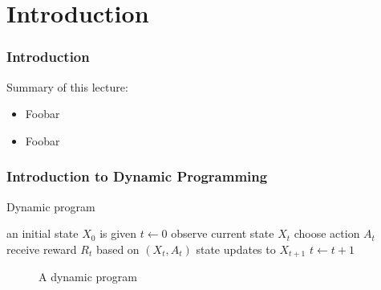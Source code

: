 


\subtitle{Dynamic Programming}

\author{John Stachurski}

\date{September 2022}




\begin{frame}
  \titlepage
\end{frame}


\section{Introduction}


\begin{frame}
    \frametitle{Introduction}

    Summary of this lecture:

    \begin{itemize}
        \item Foobar
            \vspace{0.3em}
        \item Foobar
    \end{itemize}

            \vspace{0.3em}
            \vspace{0.3em}


\end{frame}





\begin{frame}
    \frametitle{Introduction to Dynamic Programming}

    Dynamic program

    \begin{algorithm}[H]
      \DontPrintSemicolon
      an initial state $X_0$ is given \;
      $t \leftarrow 0$ \; %
      {
          observe current state $X_t$   \;
          choose action $A_t$ \;
          receive reward $R_t$ based on $(X_t, A_t)$ \;
          state updates to $X_{t+1}$ \;
          $t \leftarrow t + 1$ \;
      }
    \end{algorithm}

\end{frame}

\begin{frame}
    
    \begin{figure}
        \centering
        \vspace{1em}
        \scalebox{0.4}{}
        \vspace{1em}
        \caption{\label{f:state_action_reward} A dynamic program}
    \end{figure}

\end{frame}


